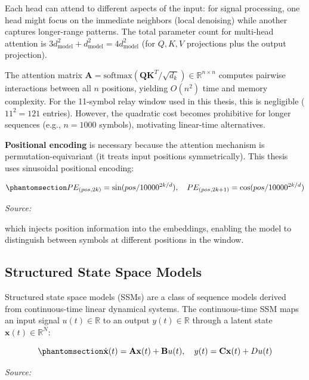 Each head can attend to different aspects of the input: for signal processing, one head might focus on the immediate neighbors (local denoising) while another captures longer-range patterns. The total parameter count for multi-head attention is \(3 d_{\text{model}}^2 + d_{\text{model}}^2 = 4 d_{\text{model}}^2\) (for \(Q, K, V\) projections plus the output projection).

The attention matrix \(\mathbf{A} = \text{softmax}(\mathbf{Q}\mathbf{K}^T / \sqrt{d_k}) \in \mathbb{R}^{n \times n}\) computes pairwise interactions between all \(n\) positions, yielding \(O(n^2)\) time and memory complexity. For the 11-symbol relay window used in this thesis, this is negligible (\(11^2 = 121\) entries). However, the quadratic cost becomes prohibitive for longer sequences (e.g., \(n = 1000\) symbols), motivating linear-time alternatives.

\textbf{Positional encoding} is necessary because the attention mechanism is permutation-equivariant (it treats input positions symmetrically). This thesis uses sinusoidal positional encoding:

\begin{equation}\protect\phantomsection\label{eq:positional-encoding}{PE_{(pos, 2k)} = \sin(pos / 10000^{2k/d}), \quad PE_{(pos, 2k+1)} = \cos(pos / 10000^{2k/d})
}\end{equation} \par{\small\textit{Source: \cite{vaswani2017attention}}}

which injects position information into the embeddings, enabling the model to distinguish between symbols at different positions in the window.

\subsection{Structured State Space Models}\label{sec:structured-state-space-models}

Structured state space models (SSMs) \cite{gu2022efficiently} are a class of sequence models derived from continuous-time linear dynamical systems. The continuous-time SSM maps an input signal \(u(t) \in \mathbb{R}\) to an output \(y(t) \in \mathbb{R}\) through a latent state \(\mathbf{x}(t) \in \mathbb{R}^N\):

\begin{equation}\protect\phantomsection\label{eq:ssm-continuous}{\dot{\mathbf{x}}(t) = \mathbf{A}\mathbf{x}(t) + \mathbf{B}u(t), \quad y(t) = \mathbf{C}\mathbf{x}(t) + Du(t)
}\end{equation} \par{\small\textit{Source: \cite{gu2022efficiently}}}

